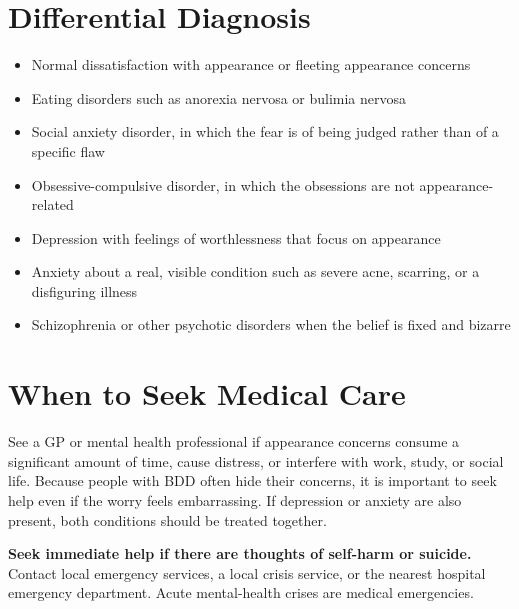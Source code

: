 \section*{Differential Diagnosis}
\begin{itemize}
    \item Normal dissatisfaction with appearance or fleeting appearance concerns
    \item Eating disorders such as anorexia nervosa or bulimia nervosa
    \item Social anxiety disorder, in which the fear is of being judged rather than of a specific flaw
    \item Obsessive-compulsive disorder, in which the obsessions are not appearance-related
    \item Depression with feelings of worthlessness that focus on appearance
    \item Anxiety about a real, visible condition such as severe acne, scarring, or a disfiguring illness
    \item Schizophrenia or other psychotic disorders when the belief is fixed and bizarre
\end{itemize}

\section*{When to Seek Medical Care}
See a GP or mental health professional if appearance concerns consume a significant amount of time, cause distress, or interfere with work, study, or social life. Because people with BDD often hide their concerns, it is important to seek help even if the worry feels embarrassing. If depression or anxiety are also present, both conditions should be treated together.

\textbf{Seek immediate help if there are thoughts of self-harm or suicide.} Contact local emergency services, a local crisis service, or the nearest hospital emergency department. Acute mental-health crises are medical emergencies.

